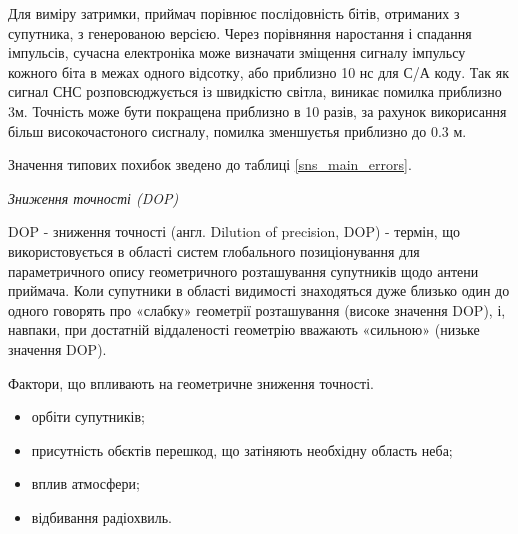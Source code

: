 Для виміру затримки, приймач порівнює послідовність бітів, отриманих з супутника, 
з генерованою версією. Через порівняння наростання і спадання імпульсів, сучасна 
електроніка може визначати зміщення сигналу імпульсу кожного біта в межах одного 
відсотку, або приблизно 10 нс для С/А коду. Так як сигнал СНС розповсюджується із 
швидкістю світла, виникає помилка приблизно 3м.
Точність може бути покращена приблизно в 10 разів, за рахунок викорисання 
більш високочастоного сисгналу, помилка зменшуєтья приблизно до 0.3 м.

Значення типових похибок зведено до таблиці \ref{sns_main_errors}. 

\vspace{5mm}
\textit{Зниження точності (DOP)}

DOP -  зниження точності (англ. Dilution of precision, DOP)
 - термін, 
що використовується в області систем глобального позиціонування для 
параметричного опису геометричного розташування супутників щодо антени 
приймача. Коли супутники в області видимості знаходяться дуже близько 
один до одного говорять про «слабку» геометрії розташування (високе значення DOP), 
і, навпаки, при достатній віддаленості геометрію вважають «сильною» (низьке значення DOP). 

Фактори, що впливають на геометричне зниження точності.
\begin{itemize}
 \item орбіти супутників;
 \item присутність обєктів перешкод, що затіняють необхідну область неба;
 \item вплив атмосфери;
 \item відбивання радіохвиль.
\end{itemize}

